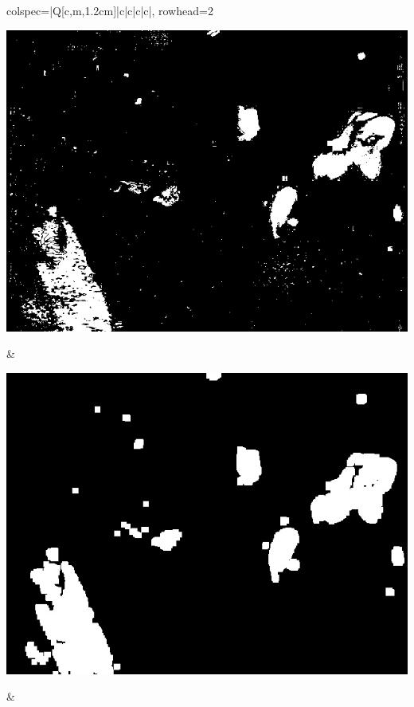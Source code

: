 \begin{longtblr}[
            caption = {Hasil uji coba proses \textit{background subtraction} menggunakan GMM yang disempurnakan oleh Operasi Morfologi},
            label = {tab:gmm_morph_9908}
        ]{
            colspec={|Q[c,m,1.2cm]|c|c|c|c|},
            rowhead=2
        }
\begin{minipage}{0.19\textwidth}
                \includegraphics[width=\linewidth]{image/gt_124/gt_124_gmm_frame1191.jpg}
            \end{minipage} & 
            \begin{minipage}{0.19\textwidth}
                \includegraphics[width=\linewidth]{image/gt_124/gt_124_dilated_3x9_frame1191.jpg}
            \end{minipage} &
            \begin{minipage}{0.19\textwidth}

\end{minipage}
\end{longtblr}
